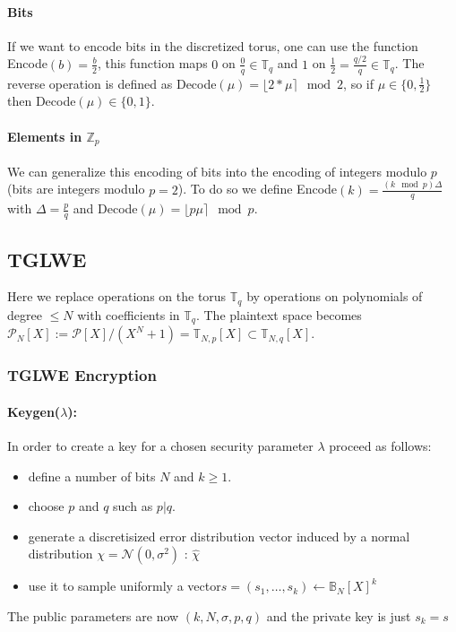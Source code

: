 \documentclass{article}
\newcommand{\Z}{\mathbb{Z}}
\newcommand{\T}{\mathbb{T}}
\newcommand{\B}{\mathbb{B}}
\newcommand{\Ncal}{\mathcal{N}}
\newcommand{\Pcal}{\mathcal{P}}
\newcommand{\round}[1]{\lfloor#1\rceil}
\theoremstyle{definition}
\theoremstyle{Theorem}
\begin{document}
\paragraph{Bits}
If we want to encode bits in the discretized torus, one can use the function Encode$(b)=\frac{b}{2}$, this function maps $0$ on $\frac{0}{q}\in\T_q$ and $1$ on $\frac{1}{2}=\frac{q/2}{q}\in\T_q$. The reverse operation is defined as Decode$(\mu) = \round{2*\mu}\mod2$, so if $\mu\in\{0,\frac{1}{2}\}$ then Decode$(\mu) \in \{0,1\}$.

\paragraph{Elements in $\Z_p$}
We can generalize this encoding of bits into the encoding of integers modulo $p$ (bits are integers modulo $p=2$). To do so we define Encode$(k)=\frac{(k\mod p)\Delta}{q}$ with $\Delta = \frac{p}{q}$ and Decode$(\mu) = \round{p\mu}\mod p$.

\subsection{TGLWE}
Here we replace operations on the torus $\T_q$ by operations on polynomials of degree $\leq N$ with coefficients in $\T_q$. 
The plaintext space becomes $\Pcal_N[X] := \Pcal[X]/(X^N+1)=\T_{N,p}[X]\subset\T_{N,q}[X]$.

\subsubsection{TGLWE Encryption}




\paragraph{Keygen($\lambda$):}
In order to create a key for a chosen security parameter $\lambda$ proceed as follows:
\begin{itemize}
\item define a number of bits $N$ and $k \ge 1$.
\item choose $p$ and $q$ such as $p|q$. 
\item generate a discretisized error distribution vector induced by a normal distribution $\chi = \Ncal(0, \sigma^2)$ : $\hat\chi$ 
\item use it to sample uniformly a vector$ s = (s_1, \dots, s_k) \leftarrow \B_N[X]^k$
\end{itemize}
The public parameters are now $(k, N, \sigma, p, q)$ and the private key is just $s_k=s$
\end{document}
